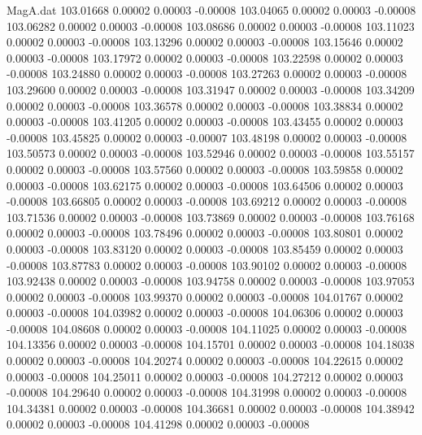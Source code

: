 \begin{filecontents}{MagA.dat}
 103.01668    0.00002    0.00003   -0.00008
 103.04065    0.00002    0.00003   -0.00008
 103.06282    0.00002    0.00003   -0.00008
 103.08686    0.00002    0.00003   -0.00008
 103.11023    0.00002    0.00003   -0.00008
 103.13296    0.00002    0.00003   -0.00008
 103.15646    0.00002    0.00003   -0.00008
 103.17972    0.00002    0.00003   -0.00008
 103.22598    0.00002    0.00003   -0.00008
 103.24880    0.00002    0.00003   -0.00008
 103.27263    0.00002    0.00003   -0.00008
 103.29600    0.00002    0.00003   -0.00008
 103.31947    0.00002    0.00003   -0.00008
 103.34209    0.00002    0.00003   -0.00008
 103.36578    0.00002    0.00003   -0.00008
 103.38834    0.00002    0.00003   -0.00008
 103.41205    0.00002    0.00003   -0.00008
 103.43455    0.00002    0.00003   -0.00008
 103.45825    0.00002    0.00003   -0.00007
 103.48198    0.00002    0.00003   -0.00008
 103.50573    0.00002    0.00003   -0.00008
 103.52946    0.00002    0.00003   -0.00008
 103.55157    0.00002    0.00003   -0.00008
 103.57560    0.00002    0.00003   -0.00008
 103.59858    0.00002    0.00003   -0.00008
 103.62175    0.00002    0.00003   -0.00008
 103.64506    0.00002    0.00003   -0.00008
 103.66805    0.00002    0.00003   -0.00008
 103.69212    0.00002    0.00003   -0.00008
 103.71536    0.00002    0.00003   -0.00008
 103.73869    0.00002    0.00003   -0.00008
 103.76168    0.00002    0.00003   -0.00008
 103.78496    0.00002    0.00003   -0.00008
 103.80801    0.00002    0.00003   -0.00008
 103.83120    0.00002    0.00003   -0.00008
 103.85459    0.00002    0.00003   -0.00008
 103.87783    0.00002    0.00003   -0.00008
 103.90102    0.00002    0.00003   -0.00008
 103.92438    0.00002    0.00003   -0.00008
 103.94758    0.00002    0.00003   -0.00008
 103.97053    0.00002    0.00003   -0.00008
 103.99370    0.00002    0.00003   -0.00008
 104.01767    0.00002    0.00003   -0.00008
 104.03982    0.00002    0.00003   -0.00008
 104.06306    0.00002    0.00003   -0.00008
 104.08608    0.00002    0.00003   -0.00008
 104.11025    0.00002    0.00003   -0.00008
 104.13356    0.00002    0.00003   -0.00008
 104.15701    0.00002    0.00003   -0.00008
 104.18038    0.00002    0.00003   -0.00008
 104.20274    0.00002    0.00003   -0.00008
 104.22615    0.00002    0.00003   -0.00008
 104.25011    0.00002    0.00003   -0.00008
 104.27212    0.00002    0.00003   -0.00008
 104.29640    0.00002    0.00003   -0.00008
 104.31998    0.00002    0.00003   -0.00008
 104.34381    0.00002    0.00003   -0.00008
 104.36681    0.00002    0.00003   -0.00008
 104.38942    0.00002    0.00003   -0.00008
 104.41298    0.00002    0.00003   -0.00008

\end{filecontents}
